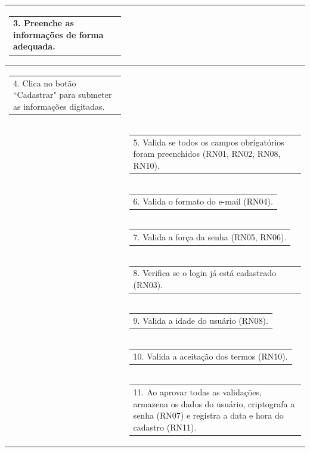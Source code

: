 \begin{longtable}[c]{|p{}|p{}|}
\multicolumn{1}{|p{0.48\textwidth}|}{\begin{tabular}[c]{@{}p{}@{}}3. Preenche as informações de forma adequada.\end{tabular}} &
   \\ \hline
\multicolumn{1}{|p{0.48\textwidth}|}{\begin{tabular}[c]{@{}p{}@{}}4. Clica no botão ``Cadastrar" para submeter as informações digitadas.\end{tabular}} &
   \\ \hline
\multicolumn{1}{|p{0.48\textwidth}|}{} &
  \begin{tabular}[c]{@{}p{}@{}}5. Valida se todos os campos obrigatórios foram preenchidos (RN01, RN02, RN08, RN10).\end{tabular} \\ \hline
\multicolumn{1}{|p{0.48\textwidth}|}{} &
  \begin{tabular}[c]{@{}p{}@{}}6. Valida o formato do e-mail (RN04).\end{tabular} \\ \hline
\multicolumn{1}{|p{0.48\textwidth}|}{} &
  \begin{tabular}[c]{@{}p{}@{}}7. Valida a força da senha (RN05, RN06).\end{tabular} \\ \hline
\multicolumn{1}{|p{0.48\textwidth}|}{} &
  \begin{tabular}[c]{@{}p{}@{}}8. Verifica se o login já está cadastrado (RN03).\end{tabular} \\ \hline
\multicolumn{1}{|p{0.48\textwidth}|}{} &
  \begin{tabular}[c]{@{}p{}@{}}9. Valida a idade do usuário (RN08).\end{tabular} \\ \hline
\multicolumn{1}{|p{0.48\textwidth}|}{} &
  \begin{tabular}[c]{@{}p{}@{}}10. Valida a aceitação dos termos (RN10).\end{tabular} \\ \hline
\multicolumn{1}{|p{0.48\textwidth}|}{} &
  \begin{tabular}[c]{@{}p{}@{}}11. Ao aprovar todas as validações, armazena os dados do usuário, criptografa a senha (RN07) e registra a data e hora do cadastro (RN11).\end{tabular} \\ \hline

\end{longtable}

